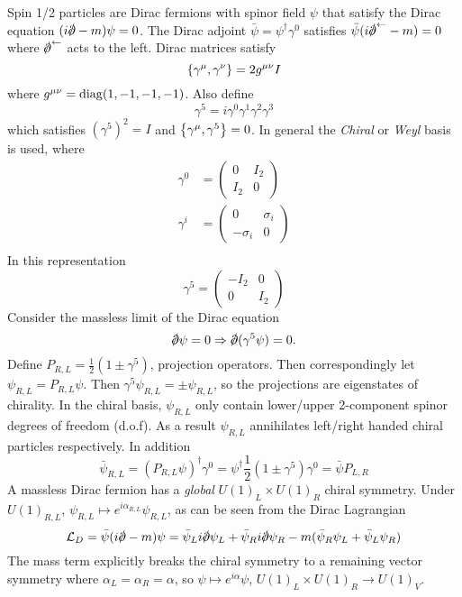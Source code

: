 \documentclass{article}
\begin{document}
Spin 1/2 particles are Dirac fermions with spinor field $\psi$ that satisfy the Dirac equation $(i\slashed{\del}-m)\psi=0$. The Dirac adjoint $\bar{\psi} = \psi^\dagger \gamma^0$ satisfies $\bar{\psi}(i\slashed{\del}^\leftarrow - m)=0$ where $\slashed{\del}^\leftarrow$ acts to the left. Dirac matrices satisfy 
\[
\acomm[\gamma^\mu]{\gamma^\nu}=2g^{\mu\nu}I
\]
where $g^{\mu\nu}=\diag(1,-1,-1,-1)$. Also define 
\[
\gamma^5 = i \gamma^0 \gamma^1 \gamma^2 \gamma^3
\]
which satisfies $(\gamma^5)^2=I$ and $\acomm[\gamma^\mu]{\gamma^5}=0$. In general the \emph{Chiral} or \emph{Weyl} basis is used, where 
\begin{align*}
    \gamma^0 &= \begin{pmatrix} 0 & I_2 \\ I_2 & 0 \end{pmatrix} \\
    \gamma^i &= \begin{pmatrix} 0 & \sigma_i \\ -\sigma_i & 0 \end{pmatrix} \\ 
\end{align*}
In this representation 
\[
\gamma^5=\begin{pmatrix} -I_2 & 0 \\ 0 & I_2 \end{pmatrix}
\]
Consider the massless limit of the Dirac equation
\[
\slashed{\del}\psi = 0 \Rightarrow \slashed{\del} ( \gamma^5\psi) = 0. 
\]
Define $P_{R,L}=\frac{1}{2} (1 \pm \gamma^5)$, projection operators. Then correspondingly let $\psi_{R,L} = P_{R,L} \psi$. Then $\gamma^5 \psi_{R,L} = \pm \psi_{R,L}$, so the projections are eigenstates of chirality. In the chiral basis, $\psi_{R,L}$ only contain lower/upper 2-component spinor degrees of freedom (d.o.f). As a result $\psi_{R,L}$ annihilates left/right handed chiral particles respectively. In addition 
\[
\bar{\psi}_{R,L} = (P_{R,L} \psi)^\dagger \gamma^0 = \psi^\dagger \frac{1}{2} (1\pm\gamma^5)\gamma^0=\bar{\psi} P_{L,R}
\]
A massless Dirac fermion has a \emph{global} $U(1)_L \times U(1)_R$ chiral symmetry. Under $U(1)_{R,L}$, $\psi_{R,L} \mapsto e^{i\alpha_{R,L}} \psi_{R,L}$, as can be seen from the Dirac Lagrangian 
\[
\mc{L}_D = \bar{\psi}(i\slashed{\del}-m)\psi = \bar{\psi}_L i \slashed{\del} \psi_L + \bar{\psi}_R i \slashed{\del} \psi_R - m(\bar{\psi}_R\psi_L + \bar{\psi}_L \psi_R) 
\]
The mass term explicitly breaks the chiral symmetry to a remaining vector symmetry where $\alpha_L = \alpha_R = \alpha$, so $\psi \mapsto e^{i\alpha} \psi$, $U(1)_L \times U(1)_R \to U(1)_V$. 
\end{document}

